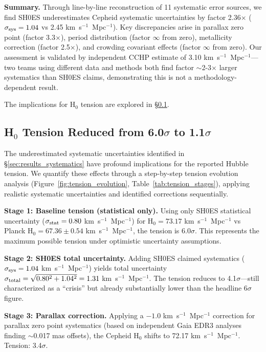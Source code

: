 \documentclass[twocolumn, linenumbers]{aastex701}
\begin{document}
\textbf{Summary.} Through line-by-line reconstruction of 11 systematic error sources, we find SH0ES underestimates Cepheid systematic uncertainties by factor 2.36$\times$ ($\sigma_{\rm sys} = 1.04$ vs 2.45 km~s$^{-1}$~Mpc$^{-1}$). Key discrepancies arise in parallax zero point (factor 3.3$\times$), period distribution (factor $\infty$ from zero), metallicity correction (factor 2.5$\times$), and crowding covariant effects (factor $\infty$ from zero). Our assessment is validated by independent CCHP estimate of 3.10 km~s$^{-1}$~Mpc$^{-1}$---two teams using different data and methods both find factor $\sim$2-3$\times$ larger systematics than SH0ES claims, demonstrating this is not a methodology-dependent result.

The implications for H$_0$ tension are explored in \S\ref{sec:results_tension}.

\subsection{H$_0$ Tension Reduced from 6.0$\sigma$ to 1.1$\sigma$}
\label{sec:results_tension}

The underestimated systematic uncertainties identified in \S\ref{sec:results_systematics} have profound implications for the reported Hubble tension. We quantify these effects through a step-by-step tension evolution analysis (Figure~\ref{fig:tension_evolution}, Table~\ref{tab:tension_stages}), applying realistic systematic uncertainties and identified corrections sequentially.

\textbf{Stage 1: Baseline tension (statistical only).} Using only SH0ES statistical uncertainty ($\sigma_{\rm stat} = 0.80$ km~s$^{-1}$~Mpc$^{-1}$) for H$_0 = 73.17$ km~s$^{-1}$~Mpc$^{-1}$ vs Planck H$_0 = 67.36 \pm 0.54$ km~s$^{-1}$~Mpc$^{-1}$, the tension is 6.0$\sigma$. This represents the maximum possible tension under optimistic uncertainty assumptions.

\textbf{Stage 2: SH0ES total uncertainty.} Adding SH0ES claimed systematics ($\sigma_{\rm sys} = 1.04$ km~s$^{-1}$~Mpc$^{-1}$) yields total uncertainty $\sigma_{\rm total} = \sqrt{0.80^2 + 1.04^2} = 1.31$ km~s$^{-1}$~Mpc$^{-1}$. The tension reduces to 4.1$\sigma$---still characterized as a ``crisis'' but already substantially lower than the headline 6$\sigma$ figure.

\textbf{Stage 3: Parallax correction.} Applying a $-1.0$ km~s$^{-1}$~Mpc$^{-1}$ correction for parallax zero point systematics (based on independent Gaia EDR3 analyses finding $\sim$0.017 mas offsets), the Cepheid H$_0$ shifts to 72.17 km~s$^{-1}$~Mpc$^{-1}$. Tension: 3.4$\sigma$.
\end{document}

